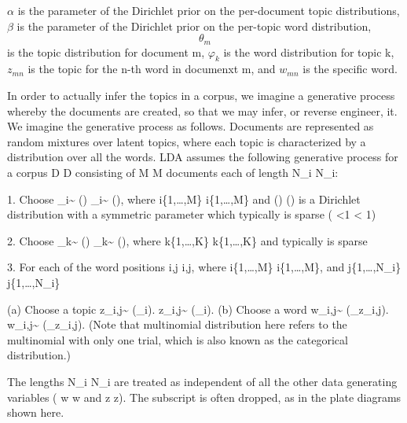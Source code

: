 $\alpha$ is the parameter of the Dirichlet prior on the per-document topic distributions,
$\beta$ is the parameter of the Dirichlet prior on the per-topic word distribution,
\[{\theta_{m}}\] is the topic distribution for document m,
$\varphi_{k}$ is the word distribution for topic k,
$z_{mn}$ is the topic for the n-th word in documenxt m, and
$w_{mn}$ is the specific word.


In order to actually infer the topics in a corpus, we imagine a generative process whereby the documents are created, so that we may infer, or reverse engineer, it. We imagine the generative process as follows. Documents are represented as random mixtures over latent topics, where each topic is characterized by a distribution over all the words. LDA assumes the following generative process for a corpus {\displaystyle D} D consisting of {\displaystyle M} M documents each of length {\displaystyle N_{i}} N_{i}:

1. Choose {\displaystyle \theta _{i}\sim {} (\alpha )} {\displaystyle \theta _{i}\sim {} (\alpha )}, where {\displaystyle i\in \{1,\dots ,M\}} i\in \{1,\dots ,M\} and {\displaystyle {} (\alpha )}  (\alpha ) is a Dirichlet distribution with a symmetric parameter {\displaystyle \alpha } \alpha  which typically is sparse ( {\displaystyle \alpha <1} \alpha < 1)

2. Choose {\displaystyle \varphi _{k}\sim {} (\beta )} {\displaystyle \varphi _{k}\sim {} (\beta )}, where {\displaystyle k\in \{1,\dots ,K\}} k\in \{1,\dots ,K\} and {\displaystyle \beta } \beta  typically is sparse

3. For each of the word positions {\displaystyle i,j} i,j, where {\displaystyle i\in \{1,\dots ,M\}} i\in \{1,\dots ,M\}, and {\displaystyle j\in \{1,\dots ,N_{i}\}} j\in \{1,\dots ,N_{i}\}

(a) Choose a topic {\displaystyle z_{i,j}\sim {} (\theta _{i}).} {\displaystyle z_{i,j}\sim {} (\theta _{i}).}
(b) Choose a word {\displaystyle w_{i,j}\sim {} (\varphi _{z_{i,j}}).} {\displaystyle w_{i,j}\sim {} (\varphi _{z_{i,j}}).}
(Note that multinomial distribution here refers to the multinomial with only one trial, which is also known as the categorical distribution.)

The lengths {\displaystyle N_{i}} N_{i} are treated as independent of all the other data generating variables ( {\displaystyle w} w and {\displaystyle z} z). The subscript is often dropped, as in the plate diagrams shown here.






